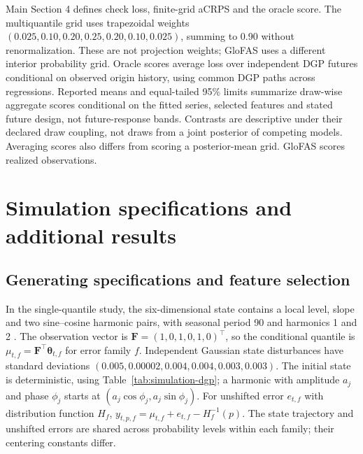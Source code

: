 \documentclass[12pt,letterpaper]{article}
\newcommand{\vect}[1]{\bm{#1}}
\numberwithin{suppalgorithm}{section}
\numberwithin{equation}{section}
\numberwithin{table}{section}
\numberwithin{figure}{section}
\begin{document}
Main Section 4 defines check loss, finite-grid aCRPS and the oracle score.
The multiquantile grid uses trapezoidal weights
\((0.025,0.10,0.20,0.25,0.20,0.10,0.025)\), summing to 0.90 without
renormalization. These are not projection weights; GloFAS uses a different
interior probability grid. Oracle scores average loss over independent
DGP futures conditional on observed origin history, using common DGP
paths across regressions. Reported means and equal-tailed 95\% limits
summarize draw-wise aggregate scores conditional on the fitted series,
selected features and stated future design, not future-response bands.
Contrasts are descriptive under their declared draw coupling, not draws
from a joint posterior of competing models. Averaging scores also differs
from scoring a posterior-mean grid. GloFAS scores realized observations.

\section{Simulation specifications and additional results}
\label{sec:supp_validation_tables}

\subsection{Generating specifications and feature selection}
\label{sec:supp_reservoir_diagnostics}
\label{sec:supp_selection_initialization}
\label{subsec:supp-independent-generating-design}
\label{subsec:supp-mq-generating-design}

In the single-quantile study, the six-dimensional state contains a local
level, slope and two sine--cosine harmonic pairs, with seasonal period 90
and harmonics 1 and 2 \citep{WestHarrison1997}. The observation vector is
\(\vect F=(1,0,1,0,1,0)^\top\), so the conditional quantile is
\(\mu_{t,f}=\vect F^\top\vect\theta_{t,f}\) for error family \(f\).
Independent Gaussian state disturbances have standard deviations
\((0.005,0.00002,0.004,0.004,0.003,0.003)\).
The initial state is deterministic, using Table~\ref{tab:simulation-dgp};
a harmonic with amplitude \(a_j\) and phase \(\phi_j\) starts at
\((a_j\cos\phi_j,a_j\sin\phi_j)\).
For unshifted error \(e_{t,f}\) with distribution function \(H_f\),
\(y_{t,p,f}=\mu_{t,f}+e_{t,f}-H_f^{-1}(p)\).
The state trajectory and unshifted errors are shared across probability
levels within each family; their centering constants differ.
\end{document}
